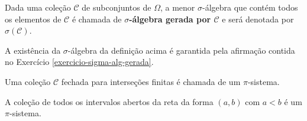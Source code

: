 \begin{definicao} 
    Dada uma coleção $\mathcal{C} $ de subconjuntos de $\Omega$, a menor
    $\sigma$-álgebra que contém todos os elementos de $\mathcal{C}$ é chamada
    de \textbf{$\sigma$-álgebra gerada por $\mathcal{C}$} e será
    denotada por $\sigma(\mathcal{C})$.
\end{definicao} 
A existência da $\sigma$-álgebra da definição acima 
é garantida pela afirmação 
contida no Exercício \ref{exercicio-sigma-alg-gerada}.
	    
	    
	    
	    
	   
    
    
\begin{definicao}[$\pi$-sistema]\label{def-pi-sistema}
   Uma coleção $\mathcal{C} $ fechada para interseções finitas é 
    chamada de um $\pi$-sistema.
\end{definicao} 
 
\begin{exemplo}
	A coleção de todos os intervalos abertos da reta da 
	forma $(a,b)$ com $a<b$ é um $\pi$-sistema.
\end{exemplo}
 

